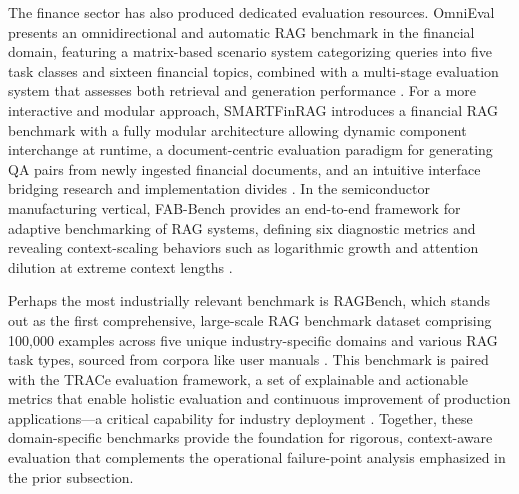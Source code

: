 \documentclass[11pt]{article}
\begin{document}
The finance sector has also produced dedicated evaluation resources. OmniEval presents an omnidirectional and automatic RAG benchmark in the financial domain, featuring a matrix-based scenario system categorizing queries into five task classes and sixteen financial topics, combined with a multi-stage evaluation system that assesses both retrieval and generation performance \cite{ref582}. For a more interactive and modular approach, SMARTFinRAG introduces a financial RAG benchmark with a fully modular architecture allowing dynamic component interchange at runtime, a document-centric evaluation paradigm for generating QA pairs from newly ingested financial documents, and an intuitive interface bridging research and implementation divides \cite{ref397}. In the semiconductor manufacturing vertical, FAB-Bench provides an end-to-end framework for adaptive benchmarking of RAG systems, defining six diagnostic metrics and revealing context-scaling behaviors such as logarithmic growth and attention dilution at extreme context lengths \cite{ref419}.

Perhaps the most industrially relevant benchmark is RAGBench, which stands out as the first comprehensive, large-scale RAG benchmark dataset comprising 100,000 examples across five unique industry-specific domains and various RAG task types, sourced from corpora like user manuals \cite{ref583}. This benchmark is paired with the TRACe evaluation framework, a set of explainable and actionable metrics that enable holistic evaluation and continuous improvement of production applications---a critical capability for industry deployment \cite{ref583}. Together, these domain-specific benchmarks provide the foundation for rigorous, context-aware evaluation that complements the operational failure-point analysis emphasized in the prior subsection.
\end{document}
